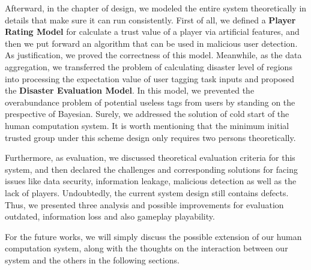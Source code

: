 Afterward, in the chapter of design, we modeled the entire system theoretically in details that make sure it can run consistently. First of all, we defined a \textbf{Player Rating Model}
for calculate a trust value of a player via artificial features, and then we put forward an algorithm
that can be used in malicious user detection. As justification, we proved the correctness of this model.
Meanwhile, as the data aggregation, we transferred the problem of calculating disaster level of regions into
processing the expectation value of user tagging task inputs and proposed the \textbf{Disaster Evaluation Model}.
In this model, we prevented the overabundance problem of potential useless tags from users by standing on the prespective of Bayesian. Surely, we addressed the solution of cold start of the human computation system.
It is worth mentioning that the minimum initial trusted group under this scheme design only requires two persons theoretically.

Furthermore, as evaluation, we discussed theoretical evaluation criteria for this system,
and then declared the challenges and corresponding solutions for facing issues like data security, information leakage, 
malicious detection as well as the lack of players.
Undoubtedly, the current system design still contains defects. Thus, we presented three analysis
and possible improvements for evaluation outdated, information loss and also gameplay playability. 

For the future works, we will simply discuss the possible extension of our human computation system,
along with the thoughts on the interaction between our system and the others in the following sections.


